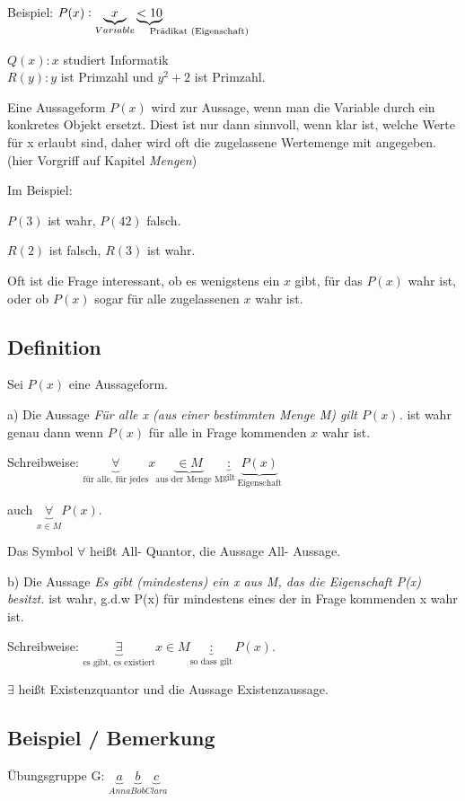 \documentclass[a4paper, 12pt, twoside] {article}
\begin{document}
Beispiel:
$P(x): \underbrace{x}_{Variable} \underbrace{< 10}_{\mathrlap{\text{Prädikat (Eigenschaft)}}}$

$Q(x): x$ studiert Informatik \\
$R(y): y$ ist Primzahl und $y^2+2$ ist Primzahl.

Eine Aussageform $P(x)$ wird zur Aussage, wenn man die Variable durch ein konkretes Objekt ersetzt. Diest ist nur dann sinnvoll, wenn klar ist, welche Werte für x erlaubt sind, daher wird oft die zugelassene Wertemenge mit angegeben. (hier Vorgriff auf Kapitel \textit{Mengen})

Im Beispiel:

$P(3)$ ist wahr, $P(42)$ falsch.

$R(2)$ ist falsch, $R(3)$ ist wahr.

Oft ist die Frage interessant, ob es wenigstens ein $x$ gibt, für das $P(x)$ wahr ist, oder ob $P(x)$ sogar für alle zugelassenen $x$ wahr ist.

\subsection[Definition (Prädikatenlogik)]{Definition} %
Sei $P(x)$ eine Aussageform.

a) Die Aussage \textit{Für alle x (aus einer bestimmten Menge M) gilt $P(x)$.} ist wahr genau dann wenn $P(x)$ für alle in Frage kommenden $x$ wahr ist.

Schreibweise: $\underbrace{\forall}_{\text{für alle, für jedes}} x \underbrace{\in M}_{\text{aus der Menge M}} \underbrace{:}_{\text{gilt}} \underbrace{P(x)}_{\text{Eigenschaft}}$

auch $\underbrace{\forall}_{x \in M} P(x)$.

Das Symbol $\forall$ heißt All- Quantor, die Aussage All- Aussage.

b) Die Aussage \textit{Es gibt (mindestens) ein x aus M, das die Eigenschaft P(x) besitzt.} ist wahr, g.d.w P(x) für mindestens eines der in Frage kommenden x wahr ist.

Schreibweise: $\underbrace{\exists}_{\text{es gibt, es existiert}} x \in M \underbrace{:}_{\text{so dass gilt}} P(x)$.

$\exists$ heißt Existenzquantor und die Aussage Existenzaussage.

\subsection{Beispiel / Bemerkung} %
Übungsgruppe G:
$\underbrace{a}_{Anna} \underbrace{b}_{Bob} \underbrace{c}_{Clara}$
\end{document}
